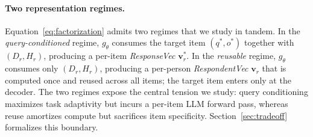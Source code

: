 \paragraph{Two representation regimes.} Equation~\ref{eq:factorization} admits two regimes that we study in tandem. In the \emph{query-conditioned} regime, $g_\theta$ consumes the target item $(q^\ast,o^\ast)$ together with $(D_r,H_r)$, producing a per-item \emph{ResponseVec} $\mathbf{v}^\ast_r$. In the \emph{reusable} regime, $g_\theta$ consumes only $(D_r,H_r)$, producing a per-person \emph{RespondentVec} $\mathbf{v}_r$ that is computed once and reused across all items; the target item enters only at the decoder. The two regimes expose the central tension we study: query conditioning maximizes task adaptivity but incurs a per-item LLM forward pass, whereas reuse amortizes compute but sacrifices item specificity. Section~\ref{sec:tradeoff} formalizes this boundary.
